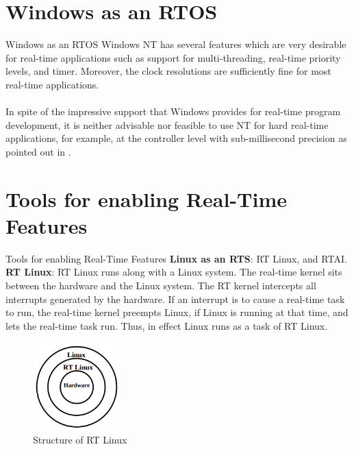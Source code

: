 \documentclass{beamer}
\begin{document}
\section{Windows as an RTOS}
\begin{frame}{Windows as an RTOS}
Windows NT has several features which are very desirable for real-time applications such as support for multi-threading, real-time priority levels, and timer. Moreover, the clock resolutions are sufficiently fine for most real-time applications. \\~\\

In spite of the impressive support that Windows provides for real-time program development, it is neither advisable nor feasible to use NT for hard real-time applications, for example, at the controller level with sub-millisecond precision as pointed out in \cite{windowsnt-k}. 
\end{frame}

\section{Tools for enabling Real-Time Features}
\begin{frame}{Tools for enabling Real-Time Features}
\textbf{Linux as an RTS}: RT Linux, and RTAI.\\
\textbf{RT Linux}: RT Linux runs along with a Linux system. The real-time kernel sits between the hardware and the Linux system. The RT kernel intercepts all interrupts generated by the hardware. If an interrupt is to cause a real-time task to run, the real-time kernel preempts Linux, if Linux is running at that time, and lets the real-time task run. Thus, in effect Linux runs as a task of RT Linux.
\begin{figure}[h]
    \centering
    \includegraphics[width=0.3\textwidth]{images/rtlinux.png}
    \caption{Structure of RT Linux}
\end{figure}
\end{frame}
\end{document}
